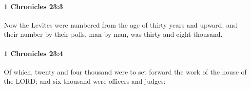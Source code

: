		\paragraph{1 Chronicles 23:3} %
			\label{1CHRONICLES-23-3}

			Now the Levites were numbered from the age of thirty years and upward: and their number by their polls, man by man, was thirty and eight thousand.


		\paragraph{1 Chronicles 23:4} %
			\label{1CHRONICLES-23-4}

			Of which, twenty and four thousand were to set forward the work of the house of the LORD; and six thousand were officers and judges:


